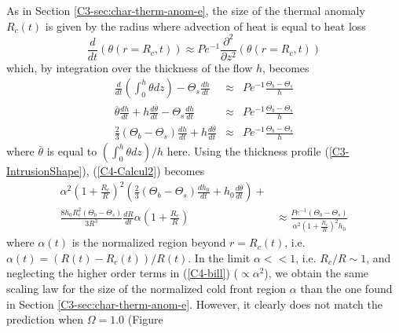 As in Section \ref{C3-sec:char-therm-anom-e},  the size of the thermal
anomaly $R_c(t)$  is given by  the radius  where advection of  heat is
equal to heat loss
\begin{equation}
  \frac{d}{d    t}\left(\theta(r=   R_c,t)\right)    \approx   Pe^{-1}
  \frac{\partial^2}{\partial z^2}\left(\theta(r=R_c,t)\right)
  \label{C4-HeatequationThermal}
\end{equation}
which, by integration over the thickness of the flow $h$, becomes
\begin{eqnarray}
  \frac{d}{dt}\left(\int_0^h\theta           dz\right)-\Theta_s\frac{d
  h}{dt}&\approx& Pe^{-1} \frac{\Theta_b-\Theta_s}{h}\nonumber\\
  \overline{\theta}\frac{d h}{dt}+h\frac{d \overline{\theta}}{dt}-\Theta_s\frac{d
  h}{dt}&\approx& Pe^{-1}
                  \frac{\Theta_b-\Theta_s}{h}\nonumber\\
  \frac{2}{3}\left(\Theta_b-\Theta_s\right)\frac{d h}{d t} +h\frac{d\overline{\theta}}{dt}&\approx& Pe^{-1}
                                                                                                    \frac{\Theta_b-\Theta_s}{h}\label{C4-Calcul2}
\end{eqnarray}
where $\overline{\theta}$  is equal to $(\int_0^h  \theta dz)/h$ here.
Using     the     thickness     profile     (\ref{C3-IntrusionShape}),
(\ref{C4-Calcul2}) becomes
\begin{eqnarray}
  \alpha^2\left(1+\frac{R_c}{R}\right)^2\left(\frac{2}{3}\left(\Theta_b-\Theta_s\right)\frac{d h_0}{d
  t}+h_0\frac{d \overline{\theta}}{d
  t}\right)+&\nonumber\\
  \frac{8h_0R_c^2\left(\Theta_b-\Theta_s\right)}{3R^3}\frac{d
  R}{d
  t}\alpha\left(1+\frac{R_c}{R}\right)                        &\approx
                                                                \frac{Pe^{-1}\left(\Theta_b-\Theta_s\right)}{\alpha^2\left(1+\frac{R_c}{R}\right)^2h_0}
                                                                \label{C4-bill}
\end{eqnarray}
where $\alpha  (t)$ is the  normalized region beyond  $r=R_c(t)$, i.e.
$\alpha(t)= \left(R(t)-R_c(t)\right)/R(t)$. In  the limit $\alpha<<1$,
i.e.   $R_c/R\sim  1$,  and  neglecting  the  higher  order  terms  in
(\ref{C4-bill}) ($\propto  \alpha^2$), we obtain the  same scaling law
for the size of the normalized cold front region $\alpha$ than the one
found in Section  \ref{C3-sec:char-therm-anom-e}.  However, it clearly
does   not   match   the    prediction   when   $\Omega=1.0$   (Figure
